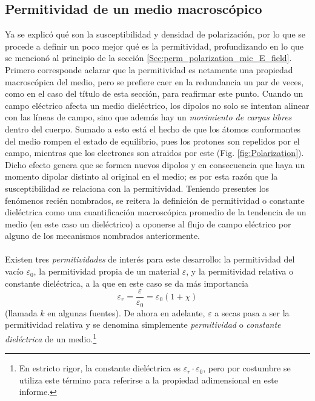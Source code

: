 \documentclass[12pt, oneside, numbers, spanish]{ezthesis}
\numberwithin{equation}{section}
\begin{document}
\subsection{Permitividad de un medio macroscópico}\label{subsec:Macro_perm}
Ya se explicó qué son la susceptibilidad y densidad de polarización, por lo que se procede a definir un poco mejor qué es la permitividad, profundizando en lo que se mencionó al principio de la sección \ref{Sec:perm_polarization_mic_E_field}.
Primero corresponde aclarar que la permitividad es netamente una propiedad macroscópica del medio, pero se prefiere caer en la redundancia un par de veces, como en el caso del título de esta sección, para reafirmar este punto. Cuando un campo eléctrico afecta un medio dieléctrico, los dipolos no solo se intentan alinear con las líneas de campo, sino que además hay un \textit{movimiento de cargas libres} dentro del cuerpo. Sumado a esto está el hecho de que los átomos conformantes del medio rompen el estado de equilibrio, pues los protones son repelidos por el campo, mientras que los electrones son atraidos por este (Fig. \ref{fig:Polarization}). Dicho efecto genera que se formen nuevos dipolos y en consecuencia que haya un momento dipolar distinto al original en el medio; es por esta razón que la susceptibilidad se relaciona con la permitividad. Teniendo presentes los fenómenos recién nombrados, se reitera la definición de permitividad o constante dieléctrica como una cuantificación macroscópica promedio de la tendencia de un medio (en este caso un dieléctrico) a oponerse al flujo de campo eléctrico por alguno de los mecanismos nombrados anteriormente.\\\\
Existen tres \textit{permitividades} de interés para este desarrollo: la permitividad del vacío $\varepsilon_0$, la permitividad propia de un material $\varepsilon$, y la permitividad relativa o constante dieléctrica, a la que en este caso se da más importancia
\begin{equation}\label{eqn:Permittivity_definition}
\varepsilon_r = \frac{\varepsilon}{\varepsilon_0}=\varepsilon_0(1+\chi)
\end{equation}
(llamada $k$ en algunas fuentes). De ahora en adelante, $\varepsilon$ a secas pasa a ser la permitividad relativa y se denomina simplemente \textit{permitividad} o \textit{constante dieléctrica} de un medio.\footnote{En estricto rigor, la constante dieléctrica es $\varepsilon_r\cdot\varepsilon_0$, pero por costumbre se utiliza este término para referirse a la propiedad adimensional en este informe.}
\end{document}
